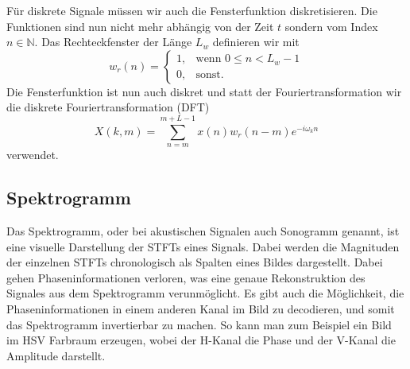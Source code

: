 Für diskrete Signale müssen wir auch die Fensterfunktion diskretisieren.
Die Funktionen sind nun nicht mehr abhängig von der Zeit $t$ sondern vom 
Index $n \in \mathbb{N}$.
Das Rechteckfenster der Länge $L_w$ definieren wir mit
\begin{equation}
    w_r(n) = 
    \begin{cases}
    1,& \text{wenn } 0 \le n < L_w-1\\
    0, & \text{sonst.}
    \end{cases}
\end{equation}
Die Fensterfunktion ist nun auch diskret und statt
der Fouriertransformation wir die diskrete Fouriertransformation (DFT)
\begin{equation}
    X(k, m) = \sum_{n = m}^{m + L - 1} x(n) w_r(n-m) e^{ -i \omega_k n}
\end{equation}
verwendet.
\subsection{Spektrogramm}

Das Spektrogramm, oder bei akustischen Signalen auch Sonogramm genannt, ist eine visuelle
Darstellung der STFTs eines Signals. 
Dabei werden die Magnituden der einzelnen STFTs chronologisch
als Spalten eines Bildes dargestellt.
Dabei gehen Phaseninformationen verloren, was eine genaue Rekonstruktion
des Signales aus dem Spektrogramm verunmöglicht.
Es gibt auch die Möglichkeit, die Phaseninformationen in einem anderen Kanal im 
Bild zu decodieren, und somit das Spektrogramm invertierbar zu machen.
So kann man zum Beispiel ein Bild im HSV Farbraum erzeugen, wobei
der H-Kanal die Phase und der V-Kanal die Amplitude darstellt.

